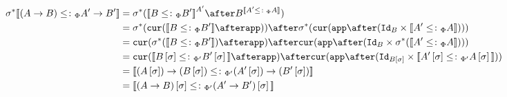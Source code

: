 {
\begin{align}
    \si\star\deno{(\ab)\subtypep\fntype{A'}{B'}} &= \si\star(\deno{B\subtypep B'}^{A'}\after B^{\deno{A'\subtypep A}})\\
    &= \si\star(\cur{\deno{B\subtypep B'}\after\app})\after\si\star(\cur{\app\after(\Id{B}\times\deno{A'\subtypep A})})\\
    & = \cur{\si\star(\deno{B\subtypep B'})\after\app}\after\cur{\app\after(\Id{B}\times\si\star(\deno{A'\subtypep A}))}\\
    & = \cur{\deno{B\ssi\subtypepp B'\ssi}\after\app}\after\cur{\app\after(\Id{B\ssi}\times\deno{A'\ssi\subtypepp A\ssi})}\\
    &= \deno{\fntype{(A\ssi)}{(B\ssi)}\subtypepp\fntype{(A'\ssi)}{(B'\ssi)}}\\
    &= \deno{(\ab)\ssi\subtypepp(\fntype{A'}{B'})\ssi}
\end{align}

}

\newcommand\effectSubstitutionTypeEnvs[0]{
    
If $\si = \deno{\typerelation{\P'}{\si}{\P}}$ then $\deno{\wellformedok{\P'}{\G\ssi}} = \si\star\deno{\wellformedok{\P}{\G}} = \deno{\wellformedok{\P}{\G}}\after\si: \cipw$.

\proof
By induction on the derivation on $\deno{\wellformedok{\P}{\G}}$. Using Naturality.

\case{Nil}
\begin{align}
    \si\star\deno{\wellformedok{\P}{\nil}} &= \term{I}\after\si\\
    &= \term{I'}\\
    &= \deno{\wellformedok{\P'}{\nil}}\\
    \deno{\wellformedok{\P'}{\nil\ssi}}\\
\end{align}

\case{Var}
\begin{align}
   \si\star\deno{\wellformedok{\P}{\gax}} &= \si\star(\square(\deno{\wellformedok{\P}{\G}},\deno{\typerelation{\P}{A}{\type}})) \\
    & = \square(\deno{\wellformedok{\P}{\G}},\deno{\typerelation{\P}{A}{\type}})\after\si\\
   & = \square(\deno{\wellformedok{\P}{\G}}\after\si, \deno{\typerelation{\P}{A}{\type}}\after\si)\\
    & = \square(\deno{\wellformedok{\P'}{\G\ssi}},\deno{\typerelation{\P'}{A\ssi}{\type}})\\
    & = \deno{\wellformedok{\P'}{\G\ssi, x: A\ssi}}\\
    & = \deno{\wellformedok{\P'}{(\gax)\ssi}}\\
\end{align}
}

